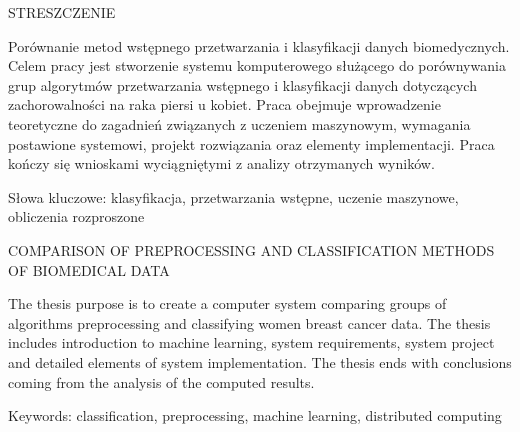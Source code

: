 \documentclass[../thesis.tex]{subfiles}
\begin{document}
\begin{center}
\fontsize{14pt}{18pt}\selectfont
STRESZCZENIE
\end{center}

\begin{flushleft}
Porównanie metod wstępnego przetwarzania i klasyfikacji danych biomedycznych. Celem pracy jest stworzenie systemu komputerowego służącego do porównywania grup algorytmów przetwarzania wstępnego i klasyfikacji danych dotyczących zachorowalności na raka piersi u kobiet. Praca obejmuje wprowadzenie teoretyczne do zagadnień związanych z uczeniem maszynowym, wymagania postawione systemowi, projekt rozwiązania oraz elementy implementacji. Praca kończy się wnioskami wyciągniętymi z analizy otrzymanych wyników.

\vspace{7.5cm}

Słowa kluczowe: klasyfikacja, przetwarzania wstępne, uczenie maszynowe, obliczenia rozproszone
\end{flushleft}

\noindent\makebox[\linewidth]{\rule{\linewidth}{0.4pt}}

\begin{center}
\fontsize{14pt}{18pt}\selectfont
COMPARISON OF PREPROCESSING AND CLASSIFICATION METHODS OF BIOMEDICAL DATA
\end{center}

\begin{flushleft}
The thesis purpose is to create a computer system comparing groups of algorithms preprocessing and classifying women breast cancer data. The thesis includes introduction to machine learning, system requirements, system project and detailed elements of system implementation. The thesis ends with conclusions coming from the analysis of the computed results.

\vspace{7.5cm}

Keywords: classification, preprocessing, machine learning, distributed computing
\end{flushleft}

\thispagestyle{empty}
\cleardoublepage 
\end{document}

